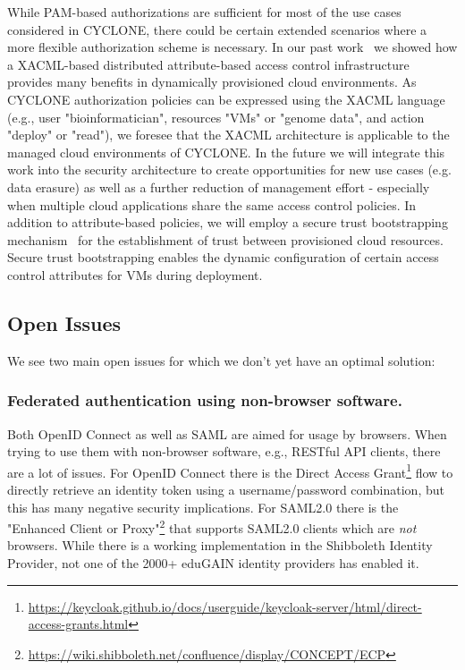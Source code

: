 \documentclass{llncs}
\begin{document}
While PAM-based authorizations are sufficient for most of the use cases considered in CYCLONE, there could be certain extended scenarios where a more flexible authorization scheme is necessary. In our past work~\cite{DLLG10,NMDL12} we showed how a XACML-based distributed attribute-based access control infrastructure provides many benefits in dynamically provisioned cloud environments. As CYCLONE authorization policies can be expressed using the XACML language (e.g., user "bioinformatician", resources "VMs" or "genome data", and action "deploy" or "read"), we foresee that the XACML architecture is applicable to the managed cloud environments of CYCLONE. In the future we will integrate this work into the security architecture to create opportunities for new use cases (e.g. data erasure) as well as a further reduction of management effort - especially when multiple cloud applications share the same access control policies. In addition to attribute-based policies, we will employ a secure trust bootstrapping mechanism~\cite{YuriBootstrapping12} for the establishment of trust between provisioned cloud resources. Secure trust bootstrapping enables the dynamic configuration of certain access control attributes for VMs during deployment.

\subsection{Open Issues}

We see two main open issues for which we don't yet have an optimal solution:

\subsubsection{Federated authentication using non-browser software.}
Both OpenID Connect as well as SAML are aimed for usage by browsers. When trying to use them with non-browser software, e.g., RESTful API clients, there are a lot of issues. For OpenID Connect there is the Direct Access Grant\footnote{\url{https://keycloak.github.io/docs/userguide/keycloak-server/html/direct-access-grants.html}} flow to directly retrieve an identity token using a username/password combination, but this has many negative security implications. For SAML2.0 there is the "Enhanced Client or Proxy"\footnote{\url{https://wiki.shibboleth.net/confluence/display/CONCEPT/ECP}} that supports SAML2.0 clients which are \textit{not} browsers. While there is a working implementation in the Shibboleth Identity Provider, not one of the 2000+ eduGAIN identity providers has enabled it.
\end{document}
